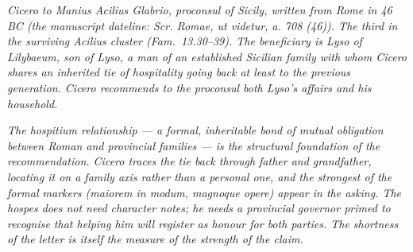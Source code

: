
\textit{Cicero to Manius Acilius Glabrio, proconsul of
Sicily, written from Rome in 46 BC (the manuscript
dateline: \textit{Scr. Romae, ut videtur, a. 708 (46)}).
The third in the surviving Acilius cluster (Fam.\
13.30--39). The beneficiary is Lyso of Lilybaeum, son of
Lyso, a man of an established Sicilian family with whom
Cicero shares an inherited tie of hospitality going
back at least to the previous generation. Cicero
recommends to the proconsul both Lyso's affairs and his
household.}

\textit{The hospitium relationship --- a formal,
inheritable bond of mutual obligation between Roman and
provincial families --- is the structural foundation of
the recommendation. Cicero traces the tie back through
father and grandfather, locating it on a family axis
rather than a personal one, and the strongest of the
formal markers (\textit{maiorem in modum},
\textit{magnoque opere}) appear in the asking. The
hospes does not need character notes; he needs a
provincial governor primed to recognise that helping
him will register as honour for both parties. The
shortness of the letter is itself the measure of the
strength of the claim.}
